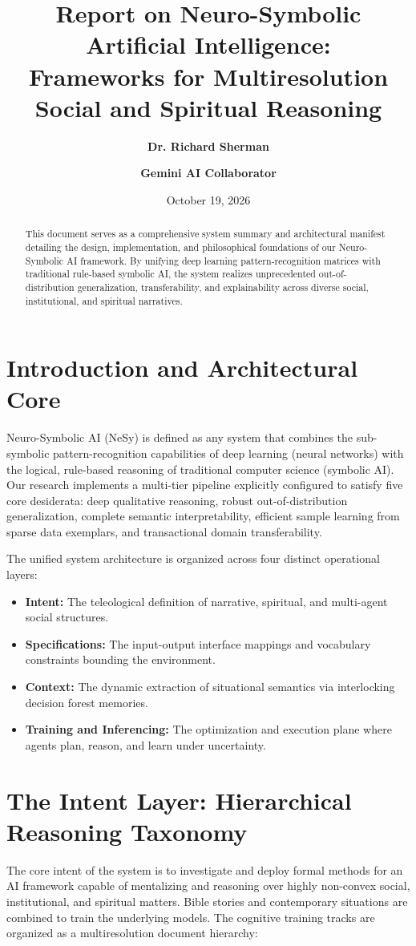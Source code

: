 \documentclass[11pt,fleqn]{article}
\title{\textbf{Report on Neuro-Symbolic Artificial Intelligence:\\ Frameworks for Multiresolution Social and Spiritual Reasoning}}
\author{\textbf{Dr. Richard Sherman} \and \textbf{Gemini AI Collaborator}}
\date{October 19, 2026}
\begin{document}
\maketitle

\begin{abstract}
This document serves as a comprehensive system summary and architectural manifest detailing the design, implementation, and philosophical foundations of our Neuro-Symbolic AI framework. By unifying deep learning pattern-recognition matrices with traditional rule-based symbolic AI, the system realizes unprecedented out-of-distribution generalization, transferability, and explainability across diverse social, institutional, and spiritual narratives.
\end{abstract}

\section{Introduction and Architectural Core}
Neuro-Symbolic AI (NeSy) is defined as any system that combines the sub-symbolic pattern-recognition capabilities of deep learning (neural networks) with the logical, rule-based reasoning of traditional computer science (symbolic AI). Our research implements a multi-tier pipeline explicitly configured to satisfy five core desiderata: deep qualitative reasoning, robust out-of-distribution generalization, complete semantic interpretability, efficient sample learning from sparse data exemplars, and transactional domain transferability.

The unified system architecture is organized across four distinct operational layers:
\begin{itemize}
    \item \textbf{Intent:} The teleological definition of narrative, spiritual, and multi-agent social structures.
    \item \textbf{Specifications:} The input-output interface mappings and vocabulary constraints bounding the environment.
    \item \textbf{Context:} The dynamic extraction of situational semantics via interlocking decision forest memories.
    \item \textbf{Training and Inferencing:} The optimization and execution plane where agents plan, reason, and learn under uncertainty.
\end{itemize}

\section{The Intent Layer: Hierarchical Reasoning Taxonomy}
The core intent of the system is to investigate and deploy formal methods for an AI framework capable of mentalizing and reasoning over highly non-convex social, institutional, and spiritual matters. Bible stories and contemporary situations are combined to train the underlying models. The cognitive training tracks are organized as a multiresolution document hierarchy:
\end{document}

